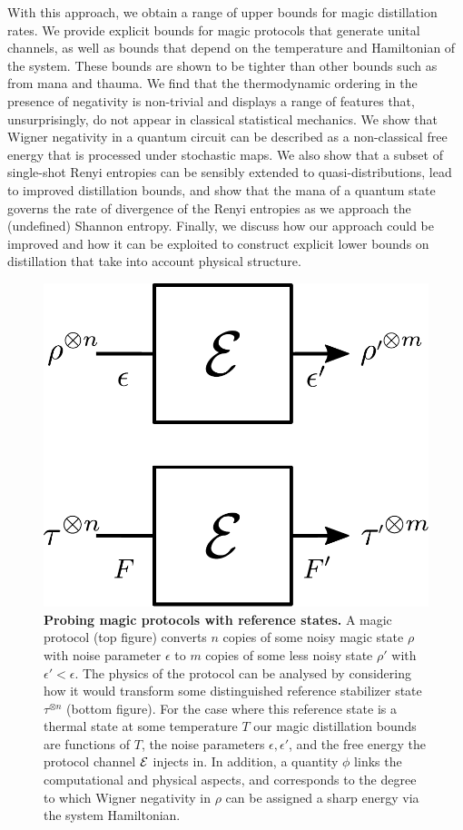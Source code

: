 \documentclass[pra,
aps,
twocolumn,
superscriptaddress,
groupedaddress,
nofootinbib,
reprint
]{revtex4-1}
\begin{document}
With this approach, we obtain a range of upper bounds for magic distillation rates. We provide explicit bounds for magic protocols that generate unital channels, as well as bounds that depend on the temperature and Hamiltonian of the system. These bounds are shown to be tighter than other bounds such as from mana and thauma. We find that the thermodynamic ordering in the presence of negativity is non-trivial and displays a range of features that, unsurprisingly, do not appear in classical statistical mechanics. We show that Wigner negativity in a quantum circuit can be described as a non-classical free energy that is processed under stochastic maps. We also show that a subset of single-shot Renyi entropies can be sensibly extended to quasi-distributions, lead to improved distillation bounds, and show that the mana of a quantum state governs the rate of divergence of the Renyi entropies as we approach the (undefined) Shannon entropy.
Finally, we discuss how our approach could be improved and how it can be exploited to construct explicit lower bounds on distillation that take into account physical structure.

\begin{figure}[t]
    \centering
        \includegraphics[scale=0.3]{figs/protocol_diagram.pdf}
    \caption{\textbf{Probing magic protocols with reference states.} 
	A magic protocol (top figure) converts $n$ copies of some noisy magic state $\rho$ with noise parameter $\epsilon$ to $m$ copies of some less noisy state $\rho'$ with $\epsilon' < \epsilon$. The physics of the protocol can be analysed by considering how it would transform some distinguished reference stabilizer state $\tau^{\otimes n}$ (bottom figure). For the case where this reference state is a thermal state at some temperature $T$ our magic distillation bounds are functions of $T$, the noise parameters $\epsilon, \epsilon'$, and the free energy the protocol channel ${\mathcal E}$ injects in. In addition, a quantity $\phi$ links the computational and physical aspects, and corresponds to the degree to which Wigner negativity in $\rho$ can be assigned a sharp energy via the system Hamiltonian.}
    \label{fig:sketch}
\end{figure}
\end{document}
